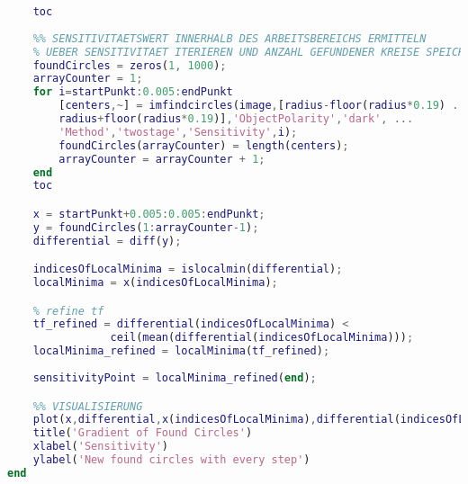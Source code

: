 \begin{lstlisting}[language=MATLAB, caption=Verfeinerung der lokalen Minima, label=lst:calculateSensitivityPoint]
    % Beende Zeitmessung
    toc
    
    %% SENSITIVITAETSWERT INNERHALB DES ARBEITSBEREICHS ERMITTELN
    % UEBER SENSITIVITAET ITERIEREN UND ANZAHL GEFUNDENER KREISE SPEICHERN
    foundCircles = zeros(1, 1000);
    arrayCounter = 1;
    for i=startPunkt:0.005:endPunkt
        [centers,~] = imfindcircles(image,[radius-floor(radius*0.19) ...
        radius+floor(radius*0.19)],'ObjectPolarity','dark', ...
        'Method','twostage','Sensitivity',i);
        foundCircles(arrayCounter) = length(centers);
        arrayCounter = arrayCounter + 1;
    end
    toc

    x = startPunkt+0.005:0.005:endPunkt;
    y = foundCircles(1:arrayCounter-1);
    differential = diff(y);

    indicesOfLocalMinima = islocalmin(differential);
    localMinima = x(indicesOfLocalMinima);

    % refine tf
    tf_refined = differential(indicesOfLocalMinima) < 
    			ceil(mean(differential(indicesOfLocalMinima)));
    localMinima_refined = localMinima(tf_refined);
    
    sensitivityPoint = localMinima_refined(end);

    %% VISUALISIERUNG
    plot(x,differential,x(indicesOfLocalMinima),differential(indicesOfLocalMinima),'r*')
    title('Gradient of Found Circles')
    xlabel('Sensitivity')
    ylabel('New found circles with every step')
end

\end{lstlisting}